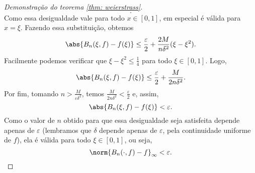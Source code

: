 \begin{proof}[Demonstração do teorema \ref{thm: weierstrass}]
\begin{equation}
    .\end{equation}
    Como essa desigualdade vale para todo \( x \in [0, 1] \), em especial é válida para \( x = \xi \).
    Fazendo essa substituição, obtemos
    \begin{equation}
        \abs{ B_{ n } (\xi, f) - f(\xi) } \leq
        \frac{ \varepsilon }{ 2 } 
        + \frac{ 2M }{ n \delta^2 } ( \xi - \xi^2 )
    .\end{equation}
    Facilmente podemos verificar que \( \xi - \xi^2 \leq \frac{ 1 }{ 4 } \) para todo \( \xi \in [0, 1] \).
    Logo,
    \begin{equation}
        \abs{ B_{ n } (\xi, f) - f(\xi) } \leq
        \frac{ \varepsilon }{ 2 } 
        + \frac{ M }{ 2 n \delta^2 }
    .\end{equation}
    Por fim, tomando \( n > \frac{ M }{ \varepsilon \delta^2 } \), temos \( \frac{ M }{ 2 n \delta^2 } < \frac{ \varepsilon }{ 2 } \) e, assim,
    \begin{equation}
        \abs{ B_{ n } (\xi, f) - f(\xi) } < \varepsilon
    .\end{equation}
    Como o valor de \( n \) obtido para que essa desigualdade seja satisfeita depende apenas de \( \varepsilon \) (lembramos que \( \delta \) depende apenas de \( \varepsilon \), pela continuidade uniforme de \( f \)), ela é válida para todo \( \xi \in [0, 1] \), ou seja, \[
        \norm{ B_{ n } (\cdot , f) - f }_{ \infty } < \varepsilon
    .\qedhere\]
 \end{proof}
 

